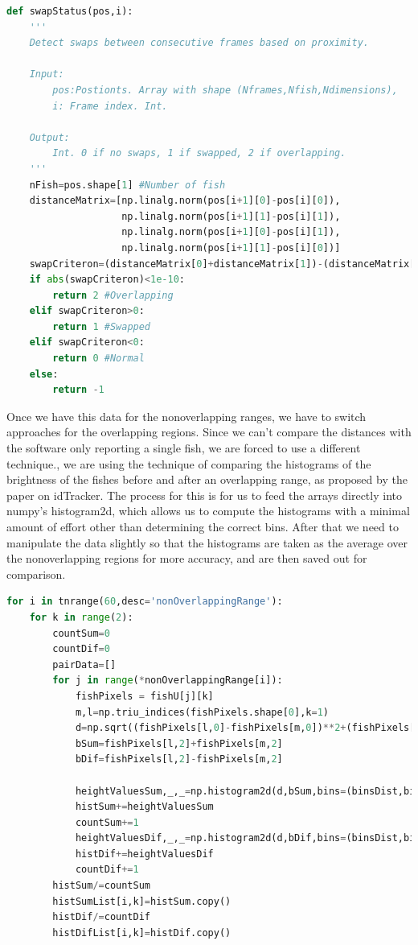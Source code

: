 \documentclass{article}
\begin{document}
\begin{minipage}[c]{\textwidth}
\begin{lstlisting}[language=Python]
def swapStatus(pos,i):
    '''
    Detect swaps between consecutive frames based on proximity.
    
    Input:
        pos:Postionts. Array with shape (Nframes,Nfish,Ndimensions),
        i: Frame index. Int.
    
    Output:
        Int. 0 if no swaps, 1 if swapped, 2 if overlapping.
    '''
    nFish=pos.shape[1] #Number of fish
    distanceMatrix=[np.linalg.norm(pos[i+1][0]-pos[i][0]),
                    np.linalg.norm(pos[i+1][1]-pos[i][1]),
                    np.linalg.norm(pos[i+1][0]-pos[i][1]),
                    np.linalg.norm(pos[i+1][1]-pos[i][0])]
    swapCriteron=(distanceMatrix[0]+distanceMatrix[1])-(distanceMatrix[2]+distanceMatrix[3])
    if abs(swapCriteron)<1e-10:
        return 2 #Overlapping
    elif swapCriteron>0:
        return 1 #Swapped
    elif swapCriteron<0:
        return 0 #Normal
    else:
        return -1
\end{lstlisting}
\end{minipage}


Once we have this data for the nonoverlapping ranges, we have to switch approaches for the overlapping regions. Since we can't compare the distances with the software only reporting a single fish, we are forced to use a different technique., we are using the technique of comparing the histograms of the brightness of the fishes before and after an overlapping range, as proposed by the paper on idTracker\cite{idTracker}. The process for this is for us to feed the arrays directly into numpy's histogram2d, which allows us to compute the histograms with a minimal amount of effort other than determining the correct bins. After that we need to manipulate the data slightly so that the histograms are taken as the average over the nonoverlapping regions for more accuracy, and are then saved out for comparison.

\begin{minipage}[c]{\textwidth}
\begin{lstlisting}[language=Python]
for i in tnrange(60,desc='nonOverlappingRange'):
    for k in range(2):
        countSum=0
        countDif=0
        pairData=[]
        for j in range(*nonOverlappingRange[i]):
            fishPixels = fishU[j][k]
            m,l=np.triu_indices(fishPixels.shape[0],k=1)
            d=np.sqrt((fishPixels[l,0]-fishPixels[m,0])**2+(fishPixels[l,1]-fishPixels[m,1])**2)
            bSum=fishPixels[l,2]+fishPixels[m,2]
            bDif=fishPixels[l,2]-fishPixels[m,2]

            heightValuesSum,_,_=np.histogram2d(d,bSum,bins=(binsDist,binsSum))
            histSum+=heightValuesSum
            countSum+=1
            heightValuesDif,_,_=np.histogram2d(d,bDif,bins=(binsDist,binsDif))
            histDif+=heightValuesDif
            countDif+=1
        histSum/=countSum
        histSumList[i,k]=histSum.copy()
        histDif/=countDif
        histDifList[i,k]=histDif.copy()
\end{lstlisting}
\end{minipage}
\end{document}

